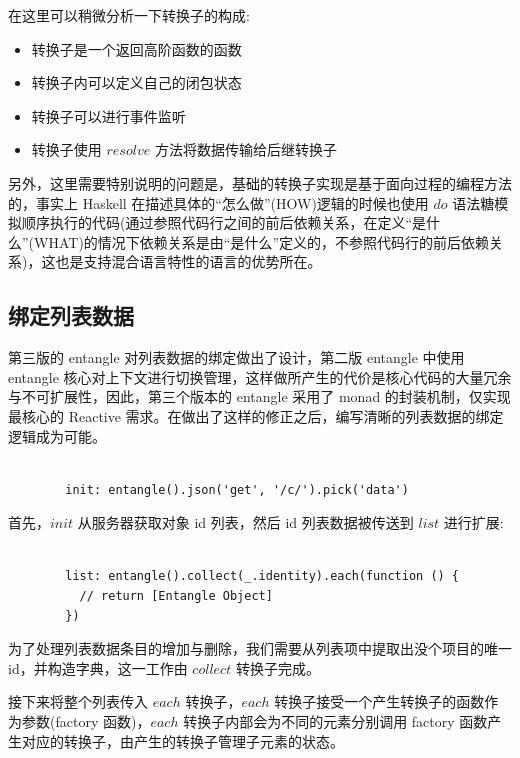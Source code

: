 在这里可以稍微分析一下转换子的构成:

\begin{itemize}
  \item 转换子是一个返回高阶函数的函数
  \item 转换子内可以定义自己的闭包状态
  \item 转换子可以进行事件监听
  \item 转换子使用 $resolve$ 方法将数据传输给后继转换子
\end{itemize}

另外，这里需要特别说明的问题是，基础的转换子实现是基于面向过程的编程方法的，事实上 Haskell 在描述具体的“怎么做”(HOW)逻辑的时候也使用 $do$ 语法糖模拟顺序执行的代码(通过参照代码行之间的前后依赖关系，在定义“是什么”(WHAT)的情况下依赖关系是由“是什么”定义的，不参照代码行的前后依赖关系)，这也是支持混合语言特性的语言的优势所在。

\subsection{绑定列表数据}

第三版的 entangle 对列表数据的绑定做出了设计，第二版 entangle 中使用 entangle 核心对上下文进行切换管理，这样做所产生的代价是核心代码的大量冗余与不可扩展性，因此，第三个版本的 entangle 采用了 monad 的封装机制，仅实现最核心的 Reactive 需求。在做出了这样的修正之后，编写清晰的列表数据的绑定逻辑成为可能。

\begin{verbatim}

        init: entangle().json('get', '/c/').pick('data')

\end{verbatim}

首先，$init$ 从服务器获取对象 id 列表，然后 id 列表数据被传送到 $list$ 进行扩展:

\begin{verbatim}

        list: entangle().collect(_.identity).each(function () {
          // return [Entangle Object]
        })

\end{verbatim}

为了处理列表数据条目的增加与删除，我们需要从列表项中提取出没个项目的唯一 id，并构造字典，这一工作由 $collect$ 转换子完成。

接下来将整个列表传入 $each$ 转换子，$each$ 转换子接受一个产生转换子的函数作为参数(factory 函数)，$each$ 转换子内部会为不同的元素分别调用 factory 函数产生对应的转换子，由产生的转换子管理子元素的状态。

